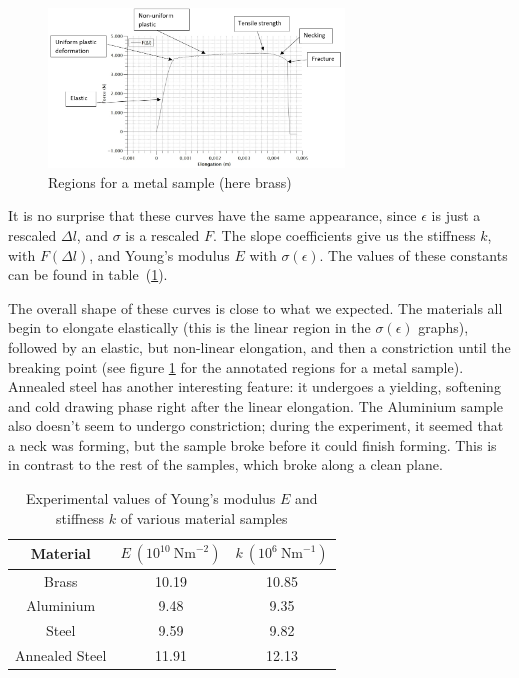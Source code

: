 \documentclass{scrartcl}
\begin{document}
\begin{figure}[h]
    \centering
    \includegraphics[width=0.7\textwidth]{Tensile/annotated_brass.png}
    \caption{Regions for a metal sample (here brass)}
    \label{fig:annotated_metal}
\end{figure}
\FloatBarrier

It is no surprise that these curves have the same appearance, since $\epsilon$ is just a rescaled $\Delta l$, and $\sigma$ is a rescaled $F$. The slope coefficients give us the stiffness $k$, with $F(\Delta l)$, and Young's modulus $E$ with $\sigma(\epsilon)$. The values of these constants can be found in table~(\ref{tab:youngMod_Stiffness}). 

The overall shape of these curves is close to what we expected. The materials all begin to elongate elastically (this is the linear region in the $\sigma(\epsilon)$ graphs), followed by an elastic, but non-linear elongation, and then a constriction until the breaking point (see figure \ref{fig:annotated_metal} for the annotated regions for a metal sample). Annealed steel has another interesting feature: it undergoes a yielding, softening and cold drawing phase right after the linear elongation. The Aluminium sample also doesn't seem to undergo constriction; during the experiment, it seemed that a neck was forming, but the sample broke before it could finish forming. This is in contrast to the rest of the samples, which broke along a clean plane.

\begin{table}[!ht]
    \centering
    \begin{tabular}{c|c|c}
        Material & $E \ (10^{10} \ \text{Nm}^{-2})$ & $k \ (10^{6} \ \text{Nm}^{-1})$ \\ \hline
        Brass & 10.19 & 10.85 \\
        Aluminium & 9.48 & 9.35 \\
        Steel & 9.59 & 9.82 \\
        Annealed Steel & 11.91 & 12.13 
    \end{tabular}
    \caption{Experimental values of Young's modulus $E$ and stiffness $k$ of various material samples}
    \label{tab:youngMod_Stiffness}
\end{table}
\end{document}
